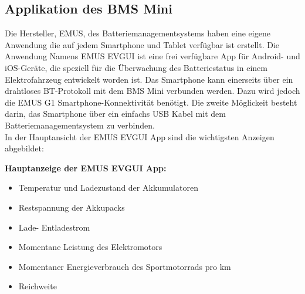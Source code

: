 \subsection{Applikation des BMS Mini}

Die Hersteller, EMUS, des Batteriemanagementsystems haben eine eigene Anwendung die auf jedem Smartphone und Tablet verfügbar ist erstellt. Die Anwendung Namens EMUS EVGUI ist eine frei verfügbare App für Android- und iOS-Geräte, die speziell für die Überwachung des Batteriestatus in einem Elektrofahrzeug entwickelt worden ist. Das Smartphone kann einerseits über ein drahtloses BT-Protokoll mit dem BMS Mini verbunden werden. Dazu wird jedoch die EMUS G1 Smartphone-Konnektivität benötigt. Die zweite Möglickeit besteht darin, das Smartphone über ein einfachs USB Kabel mit dem Batteriemanagementsystem zu verbinden.\\

In der Hauptansicht der EMUS EVGUI App sind die wichtigsten Anzeigen abgebildet:

\textbf{Hauptanzeige der EMUS EVGUI App:}
\begin{itemize}
\item{Temperatur und Ladezustand der Akkumulatoren}\\
\item{Restspannung der Akkupacks}\\
\item{Lade- Entladestrom}\\
\item{Momentane Leistung des Elektromotors}\\
\item{Momentaner Energieverbrauch des Sportmotorrads pro km}\\
\item{Reichweite}\\
\end{itemize}

